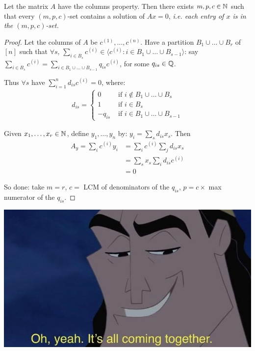 \documentclass[10pt]{article}
\begin{document}
\begin{prop}
    Let the matrix $A$ have the columns property. Then there exists $m,p,c \in \mathbb{N}$ such that every $(m,p,c)$-set contains a solution of $Ax = 0$, \it{i.e.} each entry of $x$ is in the $(m,p,c)$-set.
\end{prop}
\begin{proof}
    Let the columns of $A$ be $c^{(1)},\dots,c^{(n)}$. Have a partition $B_1\cup\dots\cup B_r$ of $[n]$ such that $\forall s$, $\sum_{i\in B_s}c^{(i)} \in \langle c^{(i)}: i \in B_1\cup\dots\cup B_{s-1}\rangle$: say $\sum_{i \in B_s}c^{(i)} = \sum_{i \in B_1\cup\dots\cup B_{s-1}}q_{is}c^{(i)}$, for some $q_{is} \in \mathbb{Q}$.

    Thus $\forall s$ have $\sum_{i=1}^{n}d_{is}c^{(i)} = 0$, where:
    \begin{align*}
        d_{is} = \left\lbrace \begin{array}{cl} 0 & \textrm{ if }i\not\in B_1\cup\dots\cup B_s\\
            1 & \textrm{ if }i\in B_s\\
            -q_{is}&\textrm{ if }i \in B_1\cup\dots\cup B_{s-1} 
        \end{array}\right.
    \end{align*}

    Given $x_1,\dots,x_r \in \mathbb{N}$, define $y_1,\dots,y_n$ by: $y_i = \sum_{s}d_{is}x_s$. Then 
    \begin{align*}
        A_y = \sum_{i}c^{(i)}y_i &= \sum_{i}c^{(i)}\sum_{j}d_{is}x_s\\
        &= \sum_{s}x_s\sum_{i}d_{is}c^{(i)}\\
        &=0
    \end{align*}

    So done: take $m =r$, $c = $ LCM of denominators of the $q_{is}$, $p = c\times$ max numerator of the $q_{is}$.
\end{proof}

\begin{center}
    \includegraphics[scale=0.8]{together.jpg}
\end{center}
\end{document}
